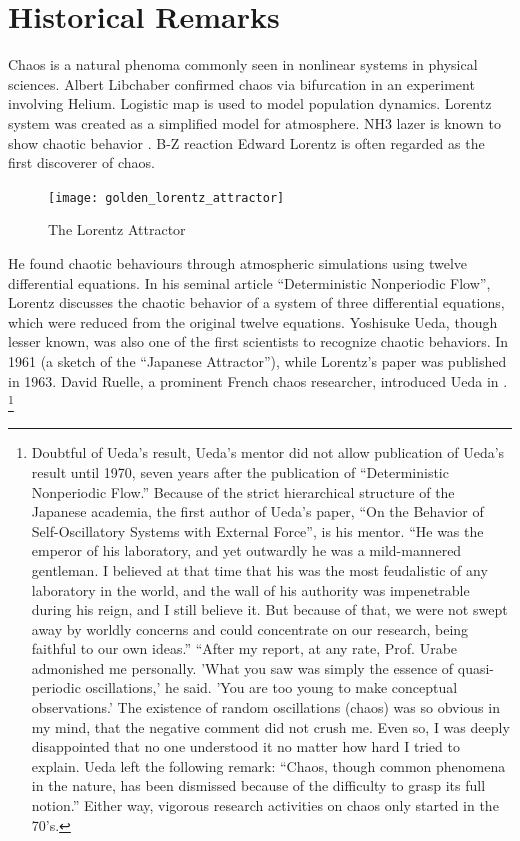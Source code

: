\documentclass[12pt,twoside]{book}
\begin{document}
\section{Historical Remarks}
Chaos is a natural phenoma commonly seen in nonlinear systems in physical sciences.
Albert Libchaber confirmed chaos via bifurcation in an experiment involving Helium.
Logistic map is used to model population dynamics.
Lorentz system was created as a simplified model for atmosphere.
NH3 lazer is known to show chaotic behavior \citep{kantz-schreiber}.
B-Z reaction
Edward Lorentz is often regarded as the first discoverer of chaos.
\begin{figure}[ht]
  \centering
  \texttt{[image: golden\_lorentz\_attractor]}
  \caption{The Lorentz Attractor}
  \label{fig:lorentz}
\end{figure}
He found chaotic behaviours through atmospheric simulations using twelve differential equations.
In his seminal article ``Deterministic Nonperiodic Flow'', Lorentz discusses the chaotic behavior of a system of three differential equations, which were reduced from the original twelve equations.
Yoshisuke Ueda, though lesser known, was also one of the first scientists to recognize chaotic behaviors.
In 1961 (a sketch of the ``Japanese Attractor''), while Lorentz's paper was published in 1963.
David Ruelle, a prominent French chaos researcher, introduced Ueda in \citep{ruelle}.
\footnote{Doubtful of Ueda's result, Ueda's mentor did not allow publication of Ueda's result until 1970, seven years after the publication of ``Deterministic Nonperiodic Flow.''
  Because of the strict hierarchical structure of the Japanese academia, the first author of Ueda's paper, ``On the Behavior of Self-Oscillatory Systems with External Force'', is his mentor.%
  ``He was the emperor of his laboratory, and yet outwardly he was a mild-mannered gentleman.
  I believed at that time that his was the most feudalistic of any laboratory in the world, and the wall of his authority was impenetrable during his reign, and I still believe it.
  But because of that, we were not swept away by worldly concerns and could concentrate on our research, being faithful to our own ideas.''
  ``After my report, at any rate, Prof. Urabe admonished me personally.
  'What you saw was simply the essence of quasi-periodic oscillations,' he said.
  'You are too young to make conceptual observations.'
  The existence of random oscillations (chaos) was so obvious in my mind, that the negative comment did not crush me.
  Even so, I was deeply disappointed that no one understood it no matter how hard I tried to explain.\citep[p47]{ueda-abraham}
  Ueda left the following remark: ``Chaos, though common phenomena in the nature, has been dismissed because of the difficulty to grasp its full notion.''\citep[p533]{gleick}
Either way, vigorous research activities on chaos only started in the 70's.}
\end{document}
